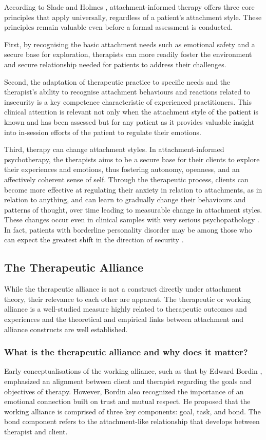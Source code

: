 \documentclass[12pt]{report}
\begin{document}
According to Slade and Holmes \cite{Slade2019}, attachment-informed therapy offers three core principles that apply universally, regardless of a patient's attachment style.
These principles remain valuable even before a formal assessment is conducted.

First, by recognising the basic attachment needs such as emotional safety and a secure base for exploration, therapists can more readily foster the environment and secure relationship needed for patients to address their challenges.

Second, the adaptation of therapeutic practice to specific needs and the therapist's ability to recognise attachment behaviours and reactions related to insecurity is a key competence characteristic of experienced practitioners. This clinical attention is relevant not only when the attachment style of the patient is known and has been assessed but for any patient as it provides valuable insight into in-session efforts of the patient to regulate their emotions.

Third, therapy can change attachment styles. In attachment-informed psychotherapy, the therapists aims to be a secure base for their clients to explore their experiences and emotions, thus fostering autonomy, openness, and an affectively coherent sense of self.
Through the therapeutic process, clients can become more effective at regulating their anxiety in relation to attachments, as in relation to anything, and can learn to gradually change their behaviours and patterns of thought, over time leading to measurable change in attachment styles.
These changes occur even in clinical samples with very serious psychopathology \cite{Fonagy1996}.
In fact, patients with borderline personality disorder may be among those who can expect the greatest shift in the direction of security \cite{Levy2006, Stovall2003}.

\subsection{The Therapeutic Alliance}
While the therapeutic alliance is not a construct directly under attachment theory, their relevance to each other are apparent. The therapeutic or working alliance is a well-studied measure highly related to therapeutic outcomes and experiences and the theoretical and empirical links between attachment and alliance constructs are well established.

\subsubsection*{What is the therapeutic alliance and why does it matter?}
Early conceptualisations of the working alliance, such as that by Edward Bordin \cite{Bordin1979}, emphasized an alignment between client and therapist regarding the goals and objectives of therapy. However, Bordin also recognized the importance of an emotional connection built on trust and mutual respect. He proposed that the working alliance is comprised of three key components: goal, task, and bond. The bond component refers to the attachment-like relationship that develops between therapist and client.
\end{document}

